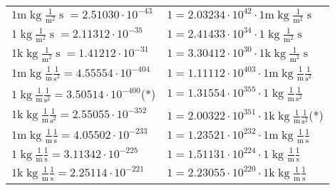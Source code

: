 \begin{center}
\begin{longtable}{l l}
{\color{gray}$1 \bm{\mathrm{ m}}\operatorname{kg}\frac1{\operatorname{m}^2}{\operatorname{s}}{}{} = 2.51030\cdot10^{-43} $}   & {\color{gray}$ 1 = 2.03234\cdot10^{42} \cdot 1 \bm{\mathrm{ m}}\operatorname{kg}\frac1{\operatorname{m}^2}{\operatorname{s}}{}{}$}  \\
{\color{black}$1 \bm{\mathrm{ }}\operatorname{kg}\frac1{\operatorname{m}^2}{\operatorname{s}}{}{} = 2.11312\cdot10^{-35} $}   & {\color{black}$ 1 = 2.41433\cdot10^{34} \cdot 1 \bm{\mathrm{ }}\operatorname{kg}\frac1{\operatorname{m}^2}{\operatorname{s}}{}{}$}  \\
{\color{gray}$1 \bm{\mathrm{ k}}\operatorname{kg}\frac1{\operatorname{m}^2}{\operatorname{s}}{}{} = 1.41212\cdot10^{-31} $}   & {\color{gray}$ 1 = 3.30412\cdot10^{30} \cdot 1 \bm{\mathrm{ k}}\operatorname{kg}\frac1{\operatorname{m}^2}{\operatorname{s}}{}{}$}  \\
{\color{gray}$1 \bm{\mathrm{ m}}\operatorname{kg}\frac1{\operatorname{m}}\frac1{\operatorname{s}^2}{}{} = 4.55554\cdot10^{-404} $}   & {\color{gray}$ 1 = 1.11112\cdot10^{403} \cdot 1 \bm{\mathrm{ m}}\operatorname{kg}\frac1{\operatorname{m}}\frac1{\operatorname{s}^2}{}{}$}  \\
{\color{black}$1 \bm{\mathrm{ }}\operatorname{kg}\frac1{\operatorname{m}}\frac1{\operatorname{s}^2}{}{} = 3.50514\cdot10^{-400} $}\quad(*) & {\color{black}$ 1 = 1.31554\cdot10^{355} \cdot 1 \bm{\mathrm{ }}\operatorname{kg}\frac1{\operatorname{m}}\frac1{\operatorname{s}^2}{}{}$}  \\
{\color{gray}$1 \bm{\mathrm{ k}}\operatorname{kg}\frac1{\operatorname{m}}\frac1{\operatorname{s}^2}{}{} = 2.55055\cdot10^{-352} $}   & {\color{gray}$ 1 = 2.00322\cdot10^{351} \cdot 1 \bm{\mathrm{ k}}\operatorname{kg}\frac1{\operatorname{m}}\frac1{\operatorname{s}^2}{}{}$}\quad(*)\\
{\color{gray}$1 \bm{\mathrm{ m}}\operatorname{kg}\frac1{\operatorname{m}}\frac1{\operatorname{s}}{}{} = 4.05502\cdot10^{-233} $}   & {\color{gray}$ 1 = 1.23521\cdot10^{232} \cdot 1 \bm{\mathrm{ m}}\operatorname{kg}\frac1{\operatorname{m}}\frac1{\operatorname{s}}{}{}$}  \\
{\color{black}$1 \bm{\mathrm{ }}\operatorname{kg}\frac1{\operatorname{m}}\frac1{\operatorname{s}}{}{} = 3.11342\cdot10^{-225} $}   & {\color{black}$ 1 = 1.51131\cdot10^{224} \cdot 1 \bm{\mathrm{ }}\operatorname{kg}\frac1{\operatorname{m}}\frac1{\operatorname{s}}{}{}$}  \\
{\color{gray}$1 \bm{\mathrm{ k}}\operatorname{kg}\frac1{\operatorname{m}}\frac1{\operatorname{s}}{}{} = 2.25114\cdot10^{-221} $}   & {\color{gray}$ 1 = 2.23055\cdot10^{220} \cdot 1 \bm{\mathrm{ k}}\operatorname{kg}\frac1{\operatorname{m}}\frac1{\operatorname{s}}{}{}$}  \\

\end{longtable}
\end{center}
